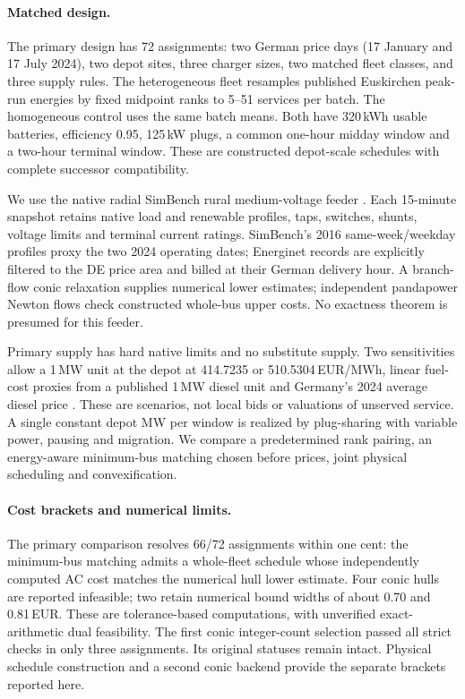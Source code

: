 \documentclass[11pt]{article}
\theoremstyle{definition}\newtheorem{definition}[theorem]{Definition}
\theoremstyle{remark}\newtheorem{remark}[theorem]{Remark}
\begin{document}
\paragraph{Matched design.}
The primary design has 72 assignments: two German price days (17 January and
17 July 2024), two depot sites, three charger sizes, two matched fleet
classes, and three supply rules. The heterogeneous fleet resamples published
Euskirchen peak-run energies by fixed midpoint ranks to 5--51 services per
batch. The homogeneous control uses the same batch means. Both have 320\,kWh
usable batteries, efficiency 0.95, 125\,kW plugs, a common one-hour midday
window and a two-hour terminal window. These are constructed depot-scale
schedules with complete successor compatibility.

We use the native radial SimBench rural medium-voltage feeder
\citep{meinecke2020simbench}. Each 15-minute snapshot retains native load and
renewable profiles, taps, switches, shunts, voltage limits and terminal
current ratings. SimBench's 2016 same-week/weekday profiles proxy the two
2024 operating dates; Energinet records are explicitly filtered to the DE
price area and billed at their German delivery hour. A branch-flow conic
relaxation \citep{farivar2013branch} supplies numerical lower estimates;
independent pandapower Newton flows check constructed whole-bus upper costs.
No exactness theorem is presumed for this feeder.

Primary supply has hard native limits and no substitute supply. Two
sensitivities allow a 1\,MW unit at the depot at 414.7235 or
510.5304\,EUR/MWh, linear fuel-cost proxies from a published 1\,MW diesel
unit and Germany's 2024 average diesel price
\citep{cat3512,adac2024diesel}. These are scenarios, not local
bids or valuations of unserved service. A single constant depot MW per
window is realized by plug-sharing with variable power, pausing and migration.
We compare a predetermined rank pairing, an energy-aware minimum-bus
matching chosen before prices, joint physical scheduling and convexification.

\paragraph{Cost brackets and numerical limits.}
The primary comparison resolves 66/72 assignments within one cent: the
minimum-bus matching admits a whole-fleet schedule whose independently
computed AC cost matches the numerical hull lower estimate. Four conic
hulls are reported infeasible; two retain numerical bound widths of about
0.70 and 0.81\,EUR. These are tolerance-based computations, with unverified
exact-arithmetic dual feasibility. The first conic integer-count selection
passed all strict checks in only three assignments. Its original statuses
remain intact. Physical schedule construction and a second conic backend
provide the separate brackets reported here.
\end{document}
